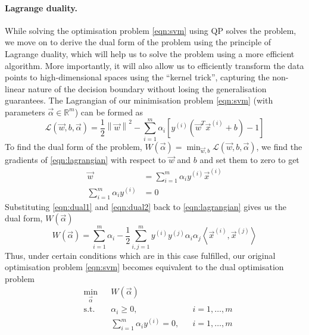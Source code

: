 \paragraph{Lagrange duality.}
	While solving the optimisation problem \eqref{eqn:svm} using QP solves the problem, we move on to derive the dual form of the problem using the principle of Lagrange duality, which will help us to solve the problem using a more efficient algorithm. More importantly, it will also allow us to efficiently transform the data points to high-dimensional spaces using the ``kernel trick'', capturing the non-linear nature of the decision boundary without losing the generalisation guarantees. The Lagrangian of our minimisation problem \eqref{eqn:svm} (with parameters $\vec{\alpha} \in \mathbb{R}^m$) can be formed as
	\begin{equation}
		\mathcal{L}(\vec{w}, b, \vec{\alpha}) = \frac{1}{2} \left\| \vec{w} \right\|^2 - \sum_{i=1}^{m} \alpha_i \left[ y^{(i)}\left( \vec{w}^T \vec{x}^{(i)} + b \right) - 1 \right]
	\label{eqn:lagrangian}
	\end{equation}
To find the dual form of the problem, $W(\vec{\alpha}) = \min_{\vec{w}, b} \mathcal{L}(\vec{w}, b, \vec{\alpha})$, we find the gradients of \eqref{eqn:lagrangian} with respect to $\vec{w}$ and $b$ and set them to zero to get
	\begin{align}
		\vec{w} 					& = \sum_{i = 1}^{m} \alpha_i y^{(i)} \vec{x}^{(i)} \label{eqn:dual1}\\
		\sum_{i = 1}^{m} \alpha_i y^{(i)}	& = 0 \label{eqn:dual2}
	\end{align}
Substituting \eqref{eqn:dual1} and \eqref{eqn:dual2} back to \eqref{eqn:lagrangian} gives us the dual form, $W(\vec{\alpha})$
	\begin{equation}
		W(\vec{\alpha}) = \sum_{i = 1}^{m} \alpha_i - \frac{1}{2} \sum_{i, j = 1}^{m} y^{(i)} y^{(j)} \alpha_i \alpha_j \left\langle \vec{x}^{(i)}, \vec{x}^{(j)} \right\rangle
		\label{eqn:dualForm}
	\end{equation}
Thus, under certain conditions which are in this case fulfilled, our original optimisation problem \eqref{eqn:svm} becomes equivalent to the dual optimisation problem
	\begin{equation}
	\begin{aligned}
		& \min_{\vec\alpha}
		& & W(\vec{\alpha}) \\
		& \text{s.t.}
		& & \alpha_i \geq 0, & &  i = 1, \dotsc, m \\
		& & & \sum_{i = 1}^{m} \alpha_i y^{(i)} = 0, & &  i = 1, \dotsc, m
	\label{eqn:dualOpt}
	\end{aligned}
	\end{equation}
